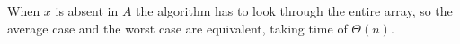 When $x$ is absent in $A$ the algorithm has to look through the entire array, so the average case and the worst case are equivalent, taking time of $\Theta(n)$.
